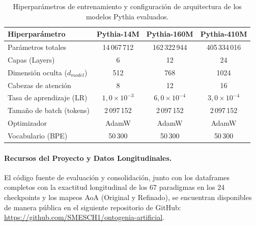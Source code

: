 \documentclass[11pt]{article}
\begin{document}
\begin{table}[h]
\centering
\small
\begin{tabular}{lccc}
\toprule
\textbf{Hiperparámetro} & \textbf{Pythia-14M} & \textbf{Pythia-160M} & \textbf{Pythia-410M} \\
\midrule
Parámetros totales & 14\,067\,712 & 162\,322\,944 & 405\,334\,016 \\
Capas (Layers) & 6 & 12 & 24 \\
Dimensión oculta ($d_{model}$) & 512 & 768 & 1024 \\
Cabezas de atención & 8 & 12 & 16 \\
Tasa de aprendizaje (LR) & $1{,}0\times 10^{-3}$ & $6{,}0\times 10^{-4}$ & $3{,}0\times 10^{-4}$ \\
Tamaño de batch (tokens) & 2\,097\,152 & 2\,097\,152 & 2\,097\,152 \\
Optimizador & AdamW & AdamW & AdamW \\
Vocabulario (BPE) & 50\,300 & 50\,300 & 50\,300 \\
\bottomrule
\end{tabular}
\caption{Hiperparámetros de entrenamiento y configuración de arquitectura de los modelos Pythia evaluados.}
\label{tab:hyperparams}
\end{table}

\paragraph{Recursos del Proyecto y Datos Longitudinales.}
El código fuente de evaluación y consolidación, junto con los dataframes completos con la exactitud longitudinal de los 67 paradigmas en los 24 checkpoints y los mapeos AoA (Original y Refinado), se encuentran disponibles de manera pública en el siguiente repositorio de GitHub:
\href{https://github.com/SMESCH1/ontogenia-artificial}{https://github.com/SMESCH1/ontogenia-artificial}.
\end{document}

